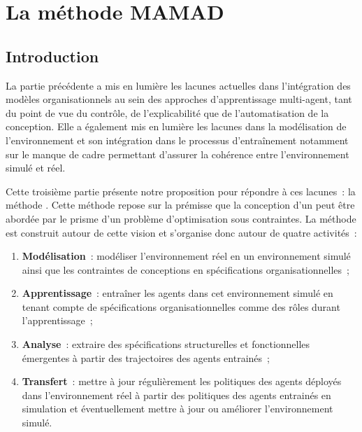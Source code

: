 \clearpage
\thispagestyle{empty}
\null
\newpage

\cleardoublepage
{}
\part{La méthode MAMAD}
\label{part:methode}

\clearpage
\thispagestyle{empty}
\null
\newpage

\chapter*{Introduction}

\noindent

La partie précédente a mis en lumière les lacunes actuelles dans l'intégration des modèles organisationnels au sein des approches d'apprentissage multi-agent, tant du point de vue du contrôle, de l'explicabilité que de l'automatisation de la conception. Elle a également mis en lumière les lacunes dans la modélisation de l'environnement et son intégration dans le processus d’entraînement notamment sur le manque de cadre permettant d'assurer la cohérence entre l'environnement simulé et réel.

\medskip

\noindent
Cette troisième partie présente notre proposition pour répondre à ces lacunes~: la méthode . Cette méthode repose sur la prémisse que la conception d'un  peut être abordée par le prisme d'un problème d'optimisation sous contraintes. La méthode est construit autour de cette vision et s'organise donc autour de quatre activités~:

\begin{enumerate}
  \item \textbf{Modélisation}~: modéliser l'environnement réel en un environnement simulé ainsi que les contraintes de conceptions en spécifications organisationnelles~;
  \item \textbf{Apprentissage}~: entraîner les agents dans cet environnement simulé en tenant compte de spécifications organisationnelles comme des rôles durant l'apprentissage~;
  \item \textbf{Analyse}~: extraire des spécifications structurelles et fonctionnelles émergentes à partir des trajectoires des agents entrainés~;
  \item \textbf{Transfert}~: mettre à jour régulièrement les politiques des agents déployés dans l'environnement réel à partir des politiques des agents entrainés en simulation et éventuellement mettre à jour ou améliorer l'environnement simulé.
\end{enumerate}

